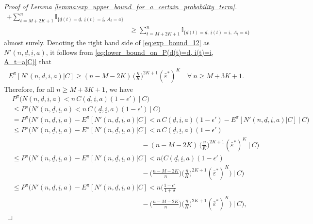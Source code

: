 \begin{proof}[Proof of Lemma \ref{lemma:exp_upper_bound_for_a_certain_probability_term}]
\begin{align}
	+ \sum\limits_{t=M+2K+1}^n\mathbb{I}_{\{\underline{d}(t)=\underline{d}, ~ \underline{i}(t)=\underline{i},~ A_t=a \}}\nonumber\\
	&\geq \sum\limits_{t=M+2K+1}^n\mathbb{I}_{\{\underline{d}(t)=\underline{d}, ~ \underline{i}(t)=\underline{i},~ A_t=a \}}
	\label{eq:exp_bound_12}
\end{align}
almost surely.
Denoting the right hand side of \eqref{eq:exp_bound_12} as $N'(n, \underline{d}, \underline{i}, a)$, it follows from \eqref{eq:lower_bound_on_P(d(t)=d, i(t)=i, A_t=a|C)} that
\begin{align}
	E^\pi[N'(n, \underline{d}, \underline{i}, a)|C]\geq (n-M-2K)\,\bigg(\frac{\eta}{K}\bigg)^{2K+1}(\bar{\varepsilon}^*)^K \quad \forall~n\geq M+3K+1.
	\label{eq:lower_bound_on_E[N'(n,d,i,a)|C]}
\end{align}
Therefore, for all $n\geq M+3K+1$, we have
\begin{align}
	&P^\pi\bigg(N(n, \underline{d}, \underline{i}, a) < n\,C(\underline{d}, \underline{i}, a)(1-\epsilon')~\bigg|~C\bigg)\nonumber\\
	&\leq P^\pi\bigg(N'(n, \underline{d}, \underline{i}, a) < n\,C(\underline{d}, \underline{i}, a)(1-\epsilon')~\bigg|~C\bigg)\nonumber\\
	&=P^\pi\bigg(N'(n, \underline{d}, \underline{i}, a) -E^\pi[N'(n, \underline{d}, \underline{i}, a)|C] < n\,C(\underline{d}, \underline{i}, a)(1-\epsilon') - E^\pi[N'(n, \underline{d}, \underline{i}, a)|C]~\bigg|~C\bigg)\nonumber\\
	&\leq P^\pi\bigg(N'(n, \underline{d}, \underline{i}, a) -E^\pi[N'(n, \underline{d}, \underline{i}, a)|C]< n\,C(\underline{d}, \underline{i}, a)(1-\epsilon') \nonumber\\
	&\hspace{8cm} - (n-M-2K)\,\bigg(\frac{\eta}{K}\bigg)^{2K+1} (\bar{\varepsilon}^*)^K~\bigg|~C\bigg)\nonumber\\
	&\leq P^\pi\bigg(N'(n, \underline{d}, \underline{i}, a) -E^\pi[N'(n, \underline{d}, \underline{i}, a)|C] < n\bigg(C(\underline{d}, \underline{i}, a)(1-\epsilon') \nonumber\\
	&\hspace{8cm}- \bigg(\frac{n-M-2K}{n}\bigg)\bigg(\frac{\eta}{K}\bigg)^{2K+1}(\bar{\varepsilon}^*)^K\bigg)~\bigg|~C\bigg)\nonumber\\
	&\leq P^\pi\bigg(N'(n, \underline{d}, \underline{i}, a) -E^\pi[N'(n, \underline{d}, \underline{i}, a)|C] < n\bigg(\frac{1-\epsilon'}{1+\delta} \nonumber\\
	&\hspace{8cm}- \bigg(\frac{n-M-2K}{n}\bigg)\bigg(\frac{\eta}{K}\bigg)^{2K+1}(\bar{\varepsilon}^*)^K\bigg)~\bigg|~C\bigg),

\end{align}
\end{proof}
